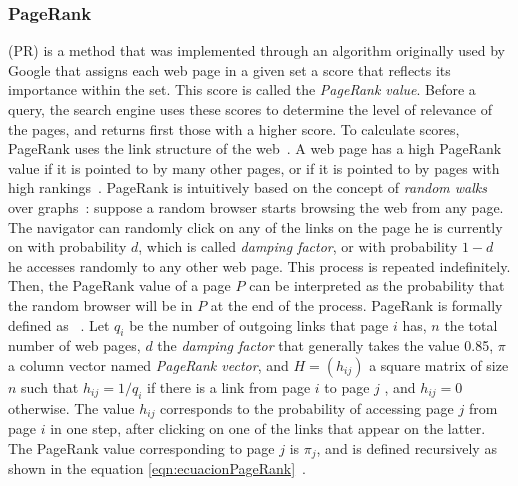 \subsubsection{PageRank}
(PR) is a method that was implemented through an algorithm originally used by Google that assigns each web page in a given set a score that reflects its importance within the set. This score is called the \textit{PageRank value}. Before a query, the search engine uses these scores to determine the level of relevance of the pages, and returns first those with a higher score. To calculate scores, PageRank uses the link structure of the web~\cite{brin1998anatomy}. A web page has a high PageRank value if it is pointed to by many other pages, or if it is pointed to by pages with high rankings~\cite{page1999pagerank}. PageRank is intuitively based on the concept of \textit{random walks} over graphs~\cite{gobel1974random}: suppose a random browser starts browsing the web from any page. The navigator can randomly click on any of the links on the page he is currently on with probability $d$, which is called \textit{damping factor}, or with probability $1-d$ he accesses randomly to any other web page. This process is repeated indefinitely. Then, the PageRank value of a page $P$ can be interpreted as the probability that the random browser will be in $P$ at the end of the process. PageRank is formally defined as ~\cite{franceschet2011pagerank}. Let $q_i$ be the number of outgoing links that page $i$ has, $n$ the total number of web pages, $d$ the \textit{damping factor} that generally takes the value 0.85, $\pi$ a column vector named \textit{PageRank vector}, and $H = (h_{ij})$ a square matrix of size $n$ such that $h_{ij} = 1/q_i$ if there is a link from page $ i$ to page $j$ , and $h_{ij} = 0$ otherwise. The value $h_{ij}$ corresponds to the probability of accessing page $j$ from page $i$ in one step, after clicking on one of the links that appear on the latter. The PageRank value corresponding to page $j$ is $\pi_j$, and is defined recursively as shown in the equation \ref{eqn:ecuacionPageRank}~\cite{lin2010data}.
